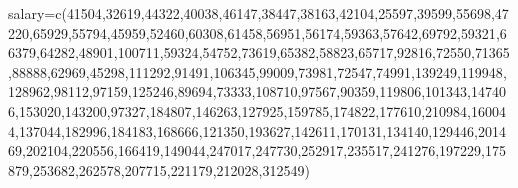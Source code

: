 \documentclass[
  letterpaper,
  DIV=11,
  numbers=noendperiod]{scrreprt}
\newenvironment{Shaded}{\begin{snugshade}}{\end{snugshade}}
\newcommand{\DecValTok}[1]{\textcolor[rgb]{0.68,0.00,0.00}{#1}}
\newcommand{\FunctionTok}[1]{\textcolor[rgb]{0.28,0.35,0.67}{#1}}
\newcommand{\NormalTok}[1]{\textcolor[rgb]{0.00,0.23,0.31}{#1}}
\newcommand{\OtherTok}[1]{\textcolor[rgb]{0.00,0.23,0.31}{#1}}
\begin{document}
\begin{Shaded}
\begin{Highlighting}[]
\NormalTok{salary}\OtherTok{=}\FunctionTok{c}\NormalTok{(}\DecValTok{41504}\NormalTok{,}\DecValTok{32619}\NormalTok{,}\DecValTok{44322}\NormalTok{,}\DecValTok{40038}\NormalTok{,}\DecValTok{46147}\NormalTok{,}\DecValTok{38447}\NormalTok{,}\DecValTok{38163}\NormalTok{,}\DecValTok{42104}\NormalTok{,}\DecValTok{25597}\NormalTok{,}\DecValTok{39599}\NormalTok{,}\DecValTok{55698}\NormalTok{,}\DecValTok{47220}\NormalTok{,}\DecValTok{65929}\NormalTok{,}\DecValTok{55794}\NormalTok{,}\DecValTok{45959}\NormalTok{,}\DecValTok{52460}\NormalTok{,}\DecValTok{60308}\NormalTok{,}\DecValTok{61458}\NormalTok{,}\DecValTok{56951}\NormalTok{,}\DecValTok{56174}\NormalTok{,}\DecValTok{59363}\NormalTok{,}\DecValTok{57642}\NormalTok{,}\DecValTok{69792}\NormalTok{,}\DecValTok{59321}\NormalTok{,}\DecValTok{66379}\NormalTok{,}\DecValTok{64282}\NormalTok{,}\DecValTok{48901}\NormalTok{,}\DecValTok{100711}\NormalTok{,}\DecValTok{59324}\NormalTok{,}\DecValTok{54752}\NormalTok{,}\DecValTok{73619}\NormalTok{,}\DecValTok{65382}\NormalTok{,}\DecValTok{58823}\NormalTok{,}\DecValTok{65717}\NormalTok{,}\DecValTok{92816}\NormalTok{,}\DecValTok{72550}\NormalTok{,}\DecValTok{71365}\NormalTok{,}\DecValTok{88888}\NormalTok{,}\DecValTok{62969}\NormalTok{,}\DecValTok{45298}\NormalTok{,}\DecValTok{111292}\NormalTok{,}\DecValTok{91491}\NormalTok{,}\DecValTok{106345}\NormalTok{,}\DecValTok{99009}\NormalTok{,}\DecValTok{73981}\NormalTok{,}\DecValTok{72547}\NormalTok{,}\DecValTok{74991}\NormalTok{,}\DecValTok{139249}\NormalTok{,}\DecValTok{119948}\NormalTok{,}\DecValTok{128962}\NormalTok{,}\DecValTok{98112}\NormalTok{,}\DecValTok{97159}\NormalTok{,}\DecValTok{125246}\NormalTok{,}\DecValTok{89694}\NormalTok{,}\DecValTok{73333}\NormalTok{,}\DecValTok{108710}\NormalTok{,}\DecValTok{97567}\NormalTok{,}\DecValTok{90359}\NormalTok{,}\DecValTok{119806}\NormalTok{,}\DecValTok{101343}\NormalTok{,}\DecValTok{147406}\NormalTok{,}\DecValTok{153020}\NormalTok{,}\DecValTok{143200}\NormalTok{,}\DecValTok{97327}\NormalTok{,}\DecValTok{184807}\NormalTok{,}\DecValTok{146263}\NormalTok{,}\DecValTok{127925}\NormalTok{,}\DecValTok{159785}\NormalTok{,}\DecValTok{174822}\NormalTok{,}\DecValTok{177610}\NormalTok{,}\DecValTok{210984}\NormalTok{,}\DecValTok{160044}\NormalTok{,}\DecValTok{137044}\NormalTok{,}\DecValTok{182996}\NormalTok{,}\DecValTok{184183}\NormalTok{,}\DecValTok{168666}\NormalTok{,}\DecValTok{121350}\NormalTok{,}\DecValTok{193627}\NormalTok{,}\DecValTok{142611}\NormalTok{,}\DecValTok{170131}\NormalTok{,}\DecValTok{134140}\NormalTok{,}\DecValTok{129446}\NormalTok{,}\DecValTok{201469}\NormalTok{,}\DecValTok{202104}\NormalTok{,}\DecValTok{220556}\NormalTok{,}\DecValTok{166419}\NormalTok{,}\DecValTok{149044}\NormalTok{,}\DecValTok{247017}\NormalTok{,}\DecValTok{247730}\NormalTok{,}\DecValTok{252917}\NormalTok{,}\DecValTok{235517}\NormalTok{,}\DecValTok{241276}\NormalTok{,}\DecValTok{197229}\NormalTok{,}\DecValTok{175879}\NormalTok{,}\DecValTok{253682}\NormalTok{,}\DecValTok{262578}\NormalTok{,}\DecValTok{207715}\NormalTok{,}\DecValTok{221179}\NormalTok{,}\DecValTok{212028}\NormalTok{,}\DecValTok{312549}\NormalTok{)}


\end{Highlighting}
\end{Shaded}
\end{document}
